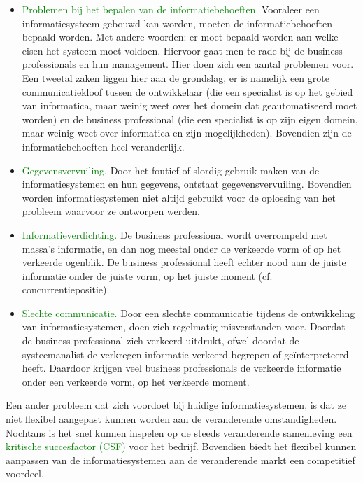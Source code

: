 \begin{itemize}
    \item \textcolor{green}{Problemen bij het bepalen van de informatiebehoeften.}
Vooraleer een informatiesysteem gebouwd kan worden, moeten de informatiebehoeften bepaald worden. Met andere woorden: er moet bepaald worden aan welke eisen het systeem moet voldoen. Hiervoor gaat men te rade bij de business professionals en hun management. Hier doen zich een aantal problemen voor. Een tweetal zaken liggen hier aan de grondslag, er is namelijk een grote communicatiekloof tussen de ontwikkelaar (die een specialist is op het gebied van informatica, maar weinig weet over het domein dat geautomatiseerd moet worden) en de business professional (die een specialist is op zijn eigen domein, maar weinig weet over informatica en zijn mogelijkheden). Bovendien zijn de informatiebehoeften heel veranderlijk.
    \item \textcolor{green}{Gegevensvervuiling.}
Door het foutief of slordig gebruik maken van de informatiesystemen en hun gegevens, ontstaat gegevensvervuiling. Bovendien worden informatiesystemen niet altijd gebruikt voor de oplossing van het probleem waarvoor ze ontworpen werden.
    \item \textcolor{green}{Informatieverdichting.}
De business professional wordt overrompeld met massa's informatie, en dan nog meestal onder de verkeerde vorm of op het verkeerde ogenblik. De business professional heeft echter nood aan de juiste informatie onder de juiste vorm, op het juiste moment (cf. concurrentiepositie).
    \item \textcolor{green}{Slechte communicatie.}
Door een slechte communicatie tijdens de ontwikkeling van informatiesystemen, doen zich regelmatig misverstanden voor. Doordat de business professional zich verkeerd uitdrukt, ofwel doordat de systeemanalist de verkregen informatie verkeerd begrepen of geïnterpreteerd heeft. Daardoor krijgen veel business professionals de verkeerde informatie onder een verkeerde vorm, op het verkeerde moment.
\end{itemize}
\newpage
{}

Een ander probleem dat zich voordoet bij huidige informatiesystemen, is dat ze niet flexibel aangepast kunnen worden aan de veranderende omstandigheden. Nochtans is het snel kunnen inspelen op de steeds veranderende samenleving een \textcolor{green}{kritische succesfactor (CSF)} voor het bedrijf. Bovendien biedt het flexibel kunnen aanpassen van de informatiesystemen aan de veranderende markt een competitief voordeel.


